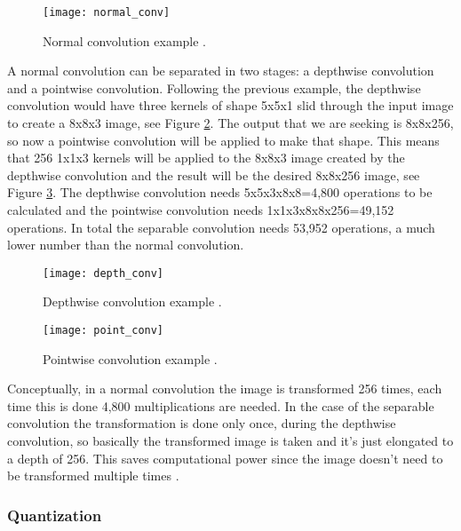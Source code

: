 \begin{figure}[thbp]
	\centering
	\texttt{[image: normal\_conv]}
	\caption[Normal convolution example.]{Normal convolution example \cite{sep_conv}.}
	\label{fig:normal_conv}
\end{figure}

A normal convolution can be separated in two stages: a depthwise convolution and a pointwise convolution. Following the previous example, the depthwise convolution would have three kernels of shape 5x5x1 slid through the input image to create a 8x8x3 image, see Figure \ref{fig:depth_conv}. The output that we are seeking is 8x8x256, so now a pointwise convolution will be applied to make that shape. This means that 256 1x1x3 kernels will be applied to the 8x8x3 image created by the depthwise convolution and the result will be the desired 8x8x256 image, see Figure \ref{fig:point_conv}. The depthwise convolution needs 5x5x3x8x8=4,800 operations to be calculated and the pointwise convolution needs 1x1x3x8x8x256=49,152 operations. In total the separable convolution needs 53,952 operations, a much lower number than the normal convolution.

\begin{figure}[thbp]
	\centering
	\texttt{[image: depth\_conv]}
	\caption[Depthwise convolution example.]{Depthwise convolution example \cite{sep_conv}.}
	\label{fig:depth_conv}
\end{figure}

\begin{figure}[thbp]
	\centering
	\texttt{[image: point\_conv]}
	\caption[Pointwise convolution example.]{Pointwise convolution example \cite{sep_conv}.}
	\label{fig:point_conv}
\end{figure}

Conceptually, in a normal convolution the image is transformed 256 times, each time this is done 4,800 multiplications are needed. In the case of the separable convolution the transformation is done only once, during the depthwise convolution, so basically the transformed image is taken and it's just elongated to a depth of 256. This saves computational power since the image doesn't need to be transformed multiple times \cite{sep_conv}.

\subsubsection{Quantization}

